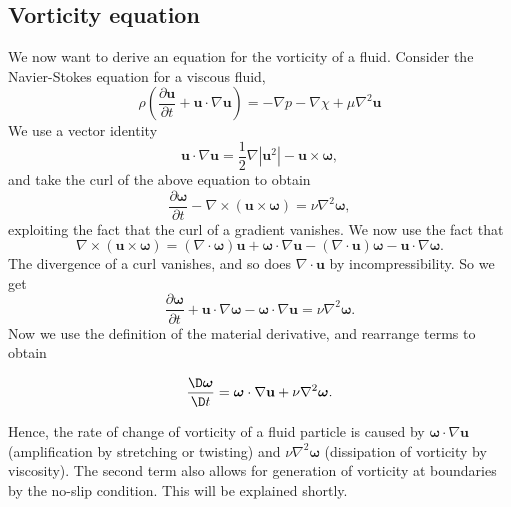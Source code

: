 \documentclass[a4paper]{article}
\begin{document}
\subsection{Vorticity equation}
We now want to derive an equation for the vorticity of a fluid. Consider the Navier-Stokes equation for a viscous fluid,
\[
  \rho\left(\frac{\partial \mathbf{u}}{\partial t} + \mathbf{u}\cdot \nabla \mathbf{u}\right) = -\nabla p - \nabla \chi + \mu \nabla^2 \mathbf{u}
\]
We use a vector identity
\[
  \mathbf{u}\cdot \nabla \mathbf{u} = \frac{1}{2}\nabla |\mathbf{u}^2| - \mathbf{u}\times \boldsymbol\omega,
\]
and take the curl of the above equation to obtain
\[
  \frac{\partial \boldsymbol\omega}{\partial t} - \nabla \times (\mathbf{u}\times \boldsymbol\omega) = \nu \nabla^2 \boldsymbol\omega,
\]
exploiting the fact that the curl of a gradient vanishes. We now use the fact that
\[
  \nabla \times (\mathbf{u}\times \boldsymbol\omega) = (\nabla \cdot \boldsymbol\omega) \mathbf{u} + \boldsymbol\omega \cdot \nabla \mathbf{u} - (\nabla \cdot \mathbf{u}) \boldsymbol\omega - \mathbf{u}\cdot \nabla \boldsymbol\omega.
\]
The divergence of a curl vanishes, and so does $\nabla \cdot \mathbf{u}$ by incompressibility. So we get
\[
  \frac{\partial \boldsymbol\omega}{\partial t} + \mathbf{u}\cdot \nabla \boldsymbol\omega - \boldsymbol\omega \cdot \nabla \mathbf{u} = \nu \nabla^2 \boldsymbol \omega.
\]
Now we use the definition of the material derivative, and rearrange terms to obtain
\begin{prop}
  \[
    \frac{\D \boldsymbol\omega}{\D t} = \boldsymbol\omega \cdot \nabla \mathbf{u} + \nu \nabla^2 \boldsymbol\omega.
  \]
\end{prop}
Hence, the rate of change of vorticity of a fluid particle is caused by $\boldsymbol\omega \cdot \nabla \mathbf{u}$ (amplification by stretching or twisting) and $\nu \nabla^2 \boldsymbol\omega$ (dissipation of vorticity by viscosity). The second term also allows for generation of vorticity at boundaries by the no-slip condition. This will be explained shortly.
\end{document}
